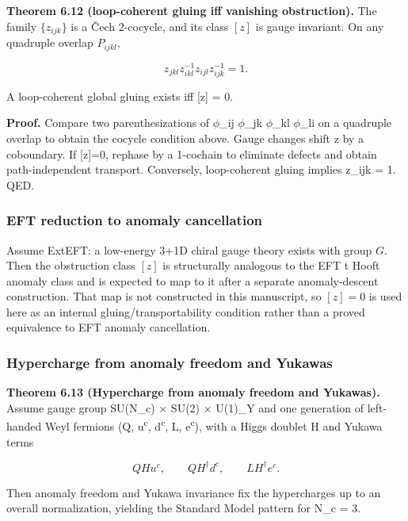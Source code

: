 \textbf{Theorem 6.12 (loop-coherent gluing iff vanishing obstruction).} The family \(\{z_{ijk}\}\) is a \v{C}ech 2-cocycle, and its class \([z]\) is gauge invariant. On any quadruple overlap \(P_{ijkl}\),

\[
z_{jkl} z_{ikl}^{-1} z_{ijl} z_{ijk}^{-1} = 1.
\]

A loop-coherent global gluing exists iff {[}z{]} = 0.

\textbf{Proof.} Compare two parenthesizations of \ensuremath{\phi}\_ij \ensuremath{\phi}\_jk \ensuremath{\phi}\_kl \ensuremath{\phi}\_li on a quadruple overlap to obtain the cocycle condition above. Gauge changes shift z by a coboundary. If {[}z{]}=0, rephase by a 1-cochain to eliminate defects and obtain path-independent transport. Conversely, loop-coherent gluing implies z\_ijk = 1. QED.

\subsubsection{EFT reduction to anomaly cancellation}\label{67-eft-reduction-to-anomaly-cancellation}

Assume ExtEFT: a low-energy 3+1D chiral gauge theory exists with group \(G\). Then the obstruction class \([z]\) is structurally analogous to the EFT \textquotesingle t Hooft anomaly class and is expected to map to it after a separate anomaly-descent construction. That map is not constructed in this manuscript, so \([z]=0\) is used here as an internal gluing/transportability condition rather than a proved equivalence to EFT anomaly cancellation.

\subsubsection{Hypercharge from anomaly freedom and Yukawas}\label{68-hypercharge-from-anomaly-freedom-and-yukawas}

\textbf{Theorem 6.13 (Hypercharge from anomaly freedom and Yukawas).} Assume gauge group SU(N\_c) \ensuremath{\times} SU(2) \ensuremath{\times} U(1)\_Y and one generation of left-handed Weyl fermions (Q, u\textsuperscript{c}, d\textsuperscript{c}, L, e\textsuperscript{c}), with a Higgs doublet H and Yukawa terms

\[
Q H u^c,\qquad Q H^\dagger d^c,\qquad L H^\dagger e^c.
\]

Then anomaly freedom and Yukawa invariance fix the hypercharges up to an overall normalization, yielding the Standard Model pattern for N\_c = 3.

